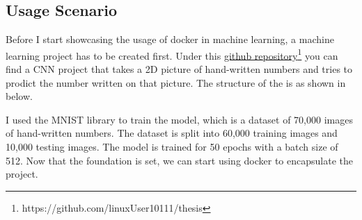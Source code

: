 \subsection{Usage Scenario}
Before I start showcasing the usage of docker in machine learning, a machine learning project has to be created first. Under this \href{https://github.com/linuxUser10111/thesis}{github repository}\footnote{https://github.com/linuxUser10111/thesis} you can find a \ac{CNN} project that takes a 2D picture of hand-written numbers and tries to prodict the number written on that picture.
The structure of the is as shown in below.

\newline
I used the MNIST library to train the model, which is a dataset of 70,000 images of hand-written numbers. 
The dataset is split into 60,000 training images and 10,000 testing images. 
The model is trained for 50 epochs with a batch size of 512.
\newline
Now that the foundation is set, we can start using docker to encapsulate the project.
